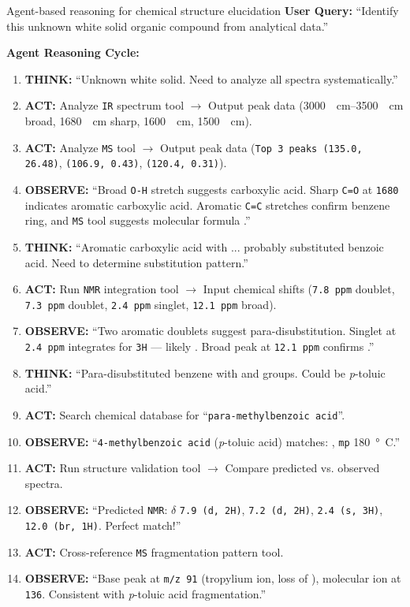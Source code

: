 \begin{examplebox}[label={example:structure_eluc}]{Agent-based reasoning for chemical structure elucidation} 
\textbf{User Query:} \enquote{Identify this unknown white solid organic compound from analytical data.}

\textbf{Agent Reasoning Cycle:}
\begin{enumerate}
\item \textbf{THINK:} \enquote{Unknown white solid. Need to analyze all spectra systematically.}
\item \textbf{ACT:} Analyze \texttt{IR} spectrum tool $\rightarrow$ Output peak data (\SIrange{3000}{3500}{\per\cm} broad, \SI{1680}{\per\cm} sharp, \SI{1600}{\per\cm}, \SI{1500}{\per\cm}).
\item \textbf{ACT:} Analyze \texttt{MS} tool $\rightarrow$ Output peak data (\texttt{Top 3 peaks (135.0, 26.48)}, \texttt{(106.9, 0.43)}, \texttt{(120.4, 0.31)}).
\item \textbf{OBSERVE:} \enquote{Broad \texttt{O-H} stretch suggests carboxylic acid. Sharp \texttt{C=O} at \texttt{1680} indicates aromatic carboxylic acid. Aromatic \texttt{C=C} stretches confirm benzene ring, and \texttt{MS} tool suggests molecular formula .}
\item \textbf{THINK:} \enquote{Aromatic carboxylic acid with ... probably substituted benzoic acid. Need to determine substitution pattern.}
\item \textbf{ACT:} Run  \texttt{NMR} integration tool $\rightarrow$ Input chemical shifts (\texttt{7.8 ppm} doublet, \texttt{7.3 ppm} doublet, \texttt{2.4 ppm} singlet, \texttt{12.1 ppm} broad).
\item \textbf{OBSERVE:} \enquote{Two aromatic doublets suggest para-disubstitution. Singlet at \texttt{2.4 ppm} integrates for \texttt{3H} --- likely . Broad peak at \texttt{12.1 ppm} confirms .}
\item \textbf{THINK:} \enquote{Para-disubstituted benzene with  and  groups. Could be \textit{p}-toluic acid.}
\item \textbf{ACT:} Search chemical database for \enquote{\texttt{para-methylbenzoic acid}}.
\item \textbf{OBSERVE:} \enquote{\texttt{4-methylbenzoic acid} (\textit{p}-toluic acid) matches: , \texttt{mp} \SI{180}{\degree C}.}
\item \textbf{ACT:} Run structure validation tool $\rightarrow$ Compare predicted vs. observed spectra.
\item \textbf{OBSERVE:} \enquote{Predicted  \texttt{NMR}: $\delta$  \texttt{7.9 (d, 2H)}, \texttt{7.2 (d, 2H)}, \texttt{2.4 (s, 3H)}, \texttt{12.0 (br, 1H)}. Perfect match!}
\item \textbf{ACT:} Cross-reference \texttt{MS} fragmentation pattern tool.
\item \textbf{OBSERVE:} \enquote{Base peak at \texttt{m/z 91} (tropylium ion, loss of ), molecular ion at \texttt{136}. Consistent with \textit{p}-toluic acid fragmentation.}
\end{enumerate}


\end{examplebox}
